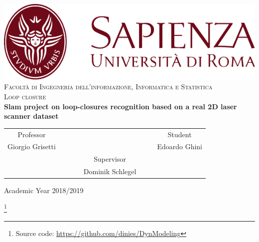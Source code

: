 \begin{titlepage}
  \begin{center}
    \includegraphics[scale=0.8]{Images/SapienzaLogo} \\
        \vspace{3em}
        {\large \textsc{Facoltà di  Ingegneria dell'informazione, Informatica e Statistica}} \\
        \vspace{2em}
        {\large \textsc{ Loop closure}} \\
        \doublespacing
        \vspace{5em}
        {\Large \textbf{Slam project on loop-closures recognition based on a real 2D laser scanner dataset}}
  \end{center}

  \vskip 2cm
  \begin{center}
    \begin{tabular}{c c c c c c c c}
      Professor & & & & & & & Student \\[0.2cm]
        \large{Giorgio Grisetti} & & & & & & & \large{Edoardo Ghini}\\[0.4cm]
         & & & & Supervisor & & & \\[0.3cm]
         & & & & \large{Dominik Schlegel} & & & \\[0.4cm]
    \end{tabular}
  \end{center}

  \vskip 1.5cm
  \begin{center}
    {\normalsize Academic Year 2018/2019}
  \end{center}

  \vskip 1.5cm
  \footnote{ Source code: \url{https://github.com/dinies/DynModeling} }

\end{titlepage}

\clearpage{\pagestyle{empty}\cleardoublepage}

\vspace{5em}

\onehalfspacing

\clearpage{\pagestyle{empty}\cleardoublepage}

